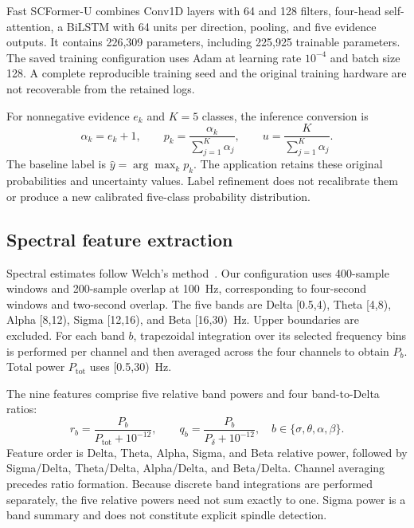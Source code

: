 \documentclass[pdflatex,sn-mathphys-num]{sn-jnl}
\begin{document}
Fast SCFormer-U combines Conv1D layers with 64 and 128 filters, four-head self-attention, a BiLSTM with 64 units per direction, pooling, and five evidence outputs. It contains 226,309 parameters, including 225,925 trainable parameters. The saved training configuration uses Adam at learning rate $10^{-4}$ and batch size 128. A complete reproducible training seed and the original training hardware are not recoverable from the retained logs.

For nonnegative evidence $e_k$ and $K=5$ classes, the inference conversion is
\begin{equation}
 \alpha_k=e_k+1,\qquad
 p_k=\frac{\alpha_k}{\sum_{j=1}^{K}\alpha_j},\qquad
 u=\frac{K}{\sum_{j=1}^{K}\alpha_j}.
\end{equation}
The baseline label is $\widehat{y}=\arg\max_k p_k$. The application retains these original probabilities and uncertainty values. Label refinement does not recalibrate them or produce a new calibrated five-class probability distribution.

\subsection{Spectral feature extraction}
Spectral estimates follow Welch's method~\cite{welch1967}. Our configuration uses 400-sample windows and 200-sample overlap at 100~Hz, corresponding to four-second windows and two-second overlap. The five bands are Delta [0.5,4), Theta [4,8), Alpha [8,12), Sigma [12,16), and Beta [16,30)~Hz. Upper boundaries are excluded. For each band $b$, trapezoidal integration over its selected frequency bins is performed per channel and then averaged across the four channels to obtain $P_b$. Total power $P_{\mathrm{tot}}$ uses [0.5,30)~Hz.

The nine features comprise five relative band powers and four band-to-Delta ratios:
\begin{equation}
 r_b=\frac{P_b}{P_{\mathrm{tot}}+10^{-12}},\qquad
 q_b=\frac{P_b}{P_{\delta}+10^{-12}},
 \quad b\in\{\sigma,\theta,\alpha,\beta\}.
\end{equation}
Feature order is Delta, Theta, Alpha, Sigma, and Beta relative power, followed by Sigma/Delta, Theta/Delta, Alpha/Delta, and Beta/Delta. Channel averaging precedes ratio formation. Because discrete band integrations are performed separately, the five relative powers need not sum exactly to one. Sigma power is a band summary and does not constitute explicit spindle detection.
\end{document}
